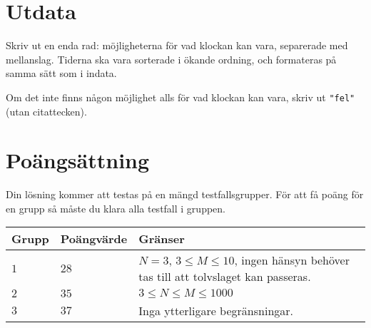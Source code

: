 \section*{Utdata}
Skriv ut en enda rad: möjligheterna för vad klockan kan vara, separerade med mellanslag.
Tiderna ska vara sorterade i ökande ordning, och formateras på samma sätt som i indata.

Om det inte finns någon möjlighet alls för vad klockan kan vara, skriv ut \texttt{"fel"} (utan citattecken).

\section*{Poängsättning}
Din lösning kommer att testas på en mängd testfallsgrupper. För att få poäng för en grupp så måste du klara alla testfall i gruppen.\\

\noindent
\begin{tabular}{| l | l | p{12cm} |}
  \hline
  Grupp & Poängvärde & Gränser \\ \hline
    $1$   & $28$     & $N = 3$, $3 \le M \le 10$, ingen hänsyn behöver tas till att tolvslaget kan passeras. \\ \hline
    $2$   & $35$     & $3 \le N \le M \le 1000$ \\ \hline
    $3$   & $37$     & Inga ytterligare begränsningar. \\ \hline
\end{tabular}
